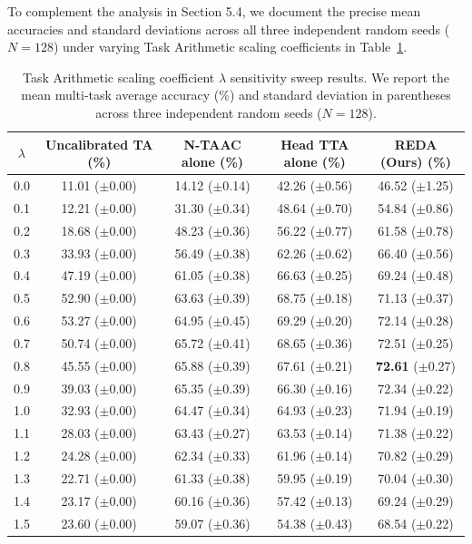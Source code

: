 \documentclass{article}
\theoremstyle{plain}
\theoremstyle{definition}
\theoremstyle{remark}
\begin{document}
To complement the analysis in Section 5.4, we document the precise mean accuracies and standard deviations across all three independent random seeds ($N=128$) under varying Task Arithmetic scaling coefficients in Table~\ref{tab:lambda_sensitivity_detailed}.

\begin{table}[h]
  \caption{Task Arithmetic scaling coefficient $\lambda$ sensitivity sweep results. We report the mean multi-task average accuracy (\%) and standard deviation in parentheses across three independent random seeds ($N=128$).}
  \label{tab:lambda_sensitivity_detailed}
  \centering
  \small
  \begin{tabular}{ccccc}
    \toprule
    $\lambda$ & Uncalibrated TA (\%) & N-TAAC alone (\%) & Head TTA alone (\%) & REDA (Ours) (\%) \\
    \midrule
    0.0 & 11.01 ($\pm$0.00) & 14.12 ($\pm$0.14) & 42.26 ($\pm$0.56) & 46.52 ($\pm$1.25) \\
    0.1 & 12.21 ($\pm$0.00) & 31.30 ($\pm$0.34) & 48.64 ($\pm$0.70) & 54.84 ($\pm$0.86) \\
    0.2 & 18.68 ($\pm$0.00) & 48.23 ($\pm$0.36) & 56.22 ($\pm$0.77) & 61.58 ($\pm$0.78) \\
    0.3 & 33.93 ($\pm$0.00) & 56.49 ($\pm$0.38) & 62.26 ($\pm$0.62) & 66.40 ($\pm$0.56) \\
    0.4 & 47.19 ($\pm$0.00) & 61.05 ($\pm$0.38) & 66.63 ($\pm$0.25) & 69.24 ($\pm$0.48) \\
    0.5 & 52.90 ($\pm$0.00) & 63.63 ($\pm$0.39) & 68.75 ($\pm$0.18) & 71.13 ($\pm$0.37) \\
    0.6 & 53.27 ($\pm$0.00) & 64.95 ($\pm$0.45) & 69.29 ($\pm$0.20) & 72.14 ($\pm$0.28) \\
    0.7 & 50.74 ($\pm$0.00) & 65.72 ($\pm$0.41) & 68.65 ($\pm$0.36) & 72.51 ($\pm$0.25) \\
    0.8 & 45.55 ($\pm$0.00) & 65.88 ($\pm$0.39) & 67.61 ($\pm$0.21) & \textbf{72.61} ($\pm$0.27) \\
    0.9 & 39.03 ($\pm$0.00) & 65.35 ($\pm$0.39) & 66.30 ($\pm$0.16) & 72.34 ($\pm$0.22) \\
    1.0 & 32.93 ($\pm$0.00) & 64.47 ($\pm$0.34) & 64.93 ($\pm$0.23) & 71.94 ($\pm$0.19) \\
    1.1 & 28.03 ($\pm$0.00) & 63.43 ($\pm$0.27) & 63.53 ($\pm$0.14) & 71.38 ($\pm$0.22) \\
    1.2 & 24.28 ($\pm$0.00) & 62.34 ($\pm$0.33) & 61.96 ($\pm$0.14) & 70.82 ($\pm$0.29) \\
    1.3 & 22.71 ($\pm$0.00) & 61.33 ($\pm$0.38) & 59.95 ($\pm$0.19) & 70.04 ($\pm$0.30) \\
    1.4 & 23.17 ($\pm$0.00) & 60.16 ($\pm$0.36) & 57.42 ($\pm$0.13) & 69.24 ($\pm$0.29) \\
    1.5 & 23.60 ($\pm$0.00) & 59.07 ($\pm$0.36) & 54.38 ($\pm$0.43) & 68.54 ($\pm$0.22) \\
    \bottomrule
  \end{tabular}
\end{table}
\end{document}
